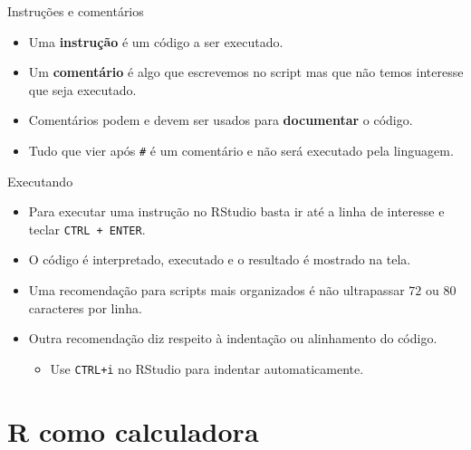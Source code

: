 \documentclass[
  ignorenonframetext,
  serif,
  professionalfont,
  usenames,
  dvipsnames,
  aspectratio = 169]{beamer}
\providecommand{\tightlist}{%
  \setlength{\itemsep}{0pt}\setlength{\parskip}{0pt}}
\renewcommand{\tightlist}{%
  \setlength{\itemsep}{0\baselineskip}
  \setlength{\parskip}{0.25\baselineskip}
}
\begin{document}
\begin{frame}[fragile]{Instruções e comentários}
\protect\hypertarget{instruuxe7uxf5es-e-comentuxe1rios}{}
\begin{itemize}
\item
  Uma \textbf{instrução} é um código a ser executado.
\item
  Um \textbf{comentário} é algo que escrevemos no script mas que não
  temos interesse que seja executado.
\item
  Comentários podem e devem ser usados para \textbf{documentar} o
  código.
\item
  Tudo que vier após \texttt{\#} é um comentário e não será executado
  pela linguagem.
\end{itemize}
\end{frame}

\begin{frame}[fragile]{Executando}
\protect\hypertarget{executando}{}
\begin{itemize}
\item
  Para executar uma instrução no RStudio basta ir até a linha de
  interesse e teclar \texttt{CTRL\ +\ ENTER}.
\item
  O código é interpretado, executado e o resultado é mostrado na tela.
\item
  Uma recomendação para scripts mais organizados é não ultrapassar
  \(72\) ou \(80\) caracteres por linha.
\item
  Outra recomendação diz respeito à indentação ou alinhamento do código.

  \begin{itemize}
  \tightlist
  \item
    Use \texttt{CTRL+i} no RStudio para indentar automaticamente.
  \end{itemize}
\end{itemize}
\end{frame}

\hypertarget{r-como-calculadora}{%
\section{R como calculadora}\label{r-como-calculadora}}
\end{document}
